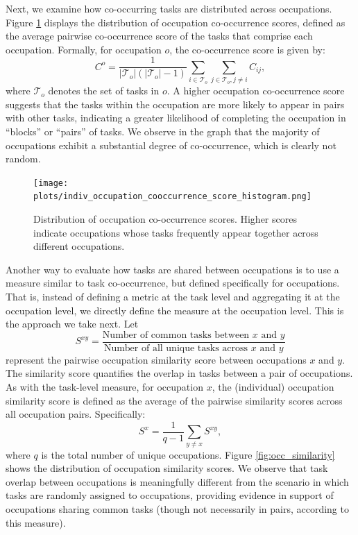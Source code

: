 \documentclass{article}
\theoremstyle{plain}
\theoremstyle{plain}
\begin{document}
Next, we examine how co-occurring tasks are distributed across occupations. 
Figure \ref{fig:occ_cooc} displays the distribution of occupation co-occurrence scores, defined as the average pairwise co-occurrence score of the tasks that comprise each occupation.
Formally, for occupation $o$, the co-occurrence score is given by:
$$C^o=\frac{1}{|\mathcal{T}_o| ( |\mathcal{T}_o|-1)} \sum_{i\in\mathcal{T}_o} \sum_{j\in\mathcal{T}_o,j\neq i} C_{ij},$$
where $\mathcal{T}_o$ denotes the set of tasks in $o$. 
A higher occupation co-occurrence score suggests that the tasks within the occupation are more likely to appear in pairs with other tasks, indicating a greater likelihood of completing the occupation in “blocks” or “pairs” of tasks. 
We observe in the graph that the majority of occupations exhibit a substantial degree of co-occurrence, which is clearly not random.


\begin{figure}[htbp]
  \centering
  \texttt{[image: plots/indiv\_occupation\_cooccurrence\_score\_histogram.png]}
  \caption{Distribution of occupation co-occurrence scores. Higher scores indicate occupations whose tasks frequently appear together across different occupations.}
  \label{fig:occ_cooc}
\end{figure}

Another way to evaluate how tasks are shared between occupations is to use a measure similar to task co-occurrence, but defined specifically for occupations. 
That is, instead of defining a metric at the task level and aggregating it at the occupation level, we directly define the measure at the occupation level. 
This is the approach we take next.
Let
$$S^{xy} = \frac{\text{Number of common tasks between $x$ and $y$}}{\text{Number of all unique tasks across $x$ and $y$}}$$
represent the pairwise occupation similarity score between occupations $x$ and $y$. 
The similarity score quantifies the overlap in tasks between a pair of occupations. 
As with the task-level measure, for occupation $x$, the (individual) occupation similarity score is defined as the average of the pairwise similarity scores across all occupation pairs. 
Specifically:
$$S^{x}=\frac{1}{q-1}\sum_{y\neq x}S^{xy},$$ where $q$ is the total number of unique occupations.
Figure \ref{fig:occ_similarity} shows the distribution of occupation similarity scores. 
We observe that task overlap between occupations is meaningfully different from the scenario in which tasks are randomly assigned to occupations, providing evidence in support of occupations sharing common tasks (though not necessarily in pairs, according to this measure).
\end{document}
